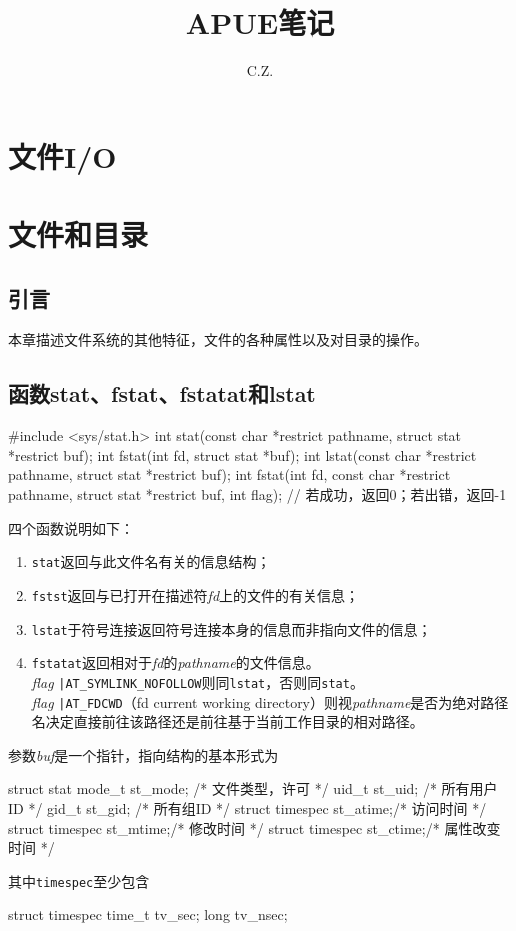 \documentclass{ctexart}
\title{APUE笔记}
\author{C.Z.}
\newcommand{\cod}[1]{\lstinline!#1!}
\newcommand{\funame}{\cod}
\newcommand{\const}{\cod}
\newcommand{\param}[1]{{\itshape #1}}
\newcommand{\struct}{\cod}
\begin{document}
  \maketitle
  \section{文件I/O}
  \section{文件和目录}
  \subsection{引言}
    本章描述文件系统的其他特征，文件的各种属性以及对目录的操作。
  \subsection{函数stat、fstat、fstatat和lstat}
  \begin{fun}[cc]
    #include <sys/stat.h>
    int stat(const char *restrict pathname, struct stat *restrict buf);
    int fstat(int fd, struct stat *buf);
    int lstat(const char *restrict pathname, struct stat *restrict buf);
    int fstat(int fd, const char *restrict pathname, struct stat *restrict buf, int flag);
    // 若成功，返回0；若出错，返回-1
  \end{fun}
  \par
  四个函数说明如下：
  \begin{enumerate}
    \item \funame{stat}返回与此文件名有关的信息结构；
    \item \funame{fstst}返回与已打开在描述符\param{fd}上的文件的有关信息；
    \item \funame{lstat}于符号连接返回符号连接本身的信息而非指向文件的信息；
    \item \funame{fstatat}返回相对于\param{fd}的\param{pathname}的文件信息。\\ \param{flag} \const{|AT_SYMLINK_NOFOLLOW}则同\funame{lstat}，否则同\funame{stat}。\\ \param{flag} \const{|AT_FDCWD}（fd current working directory）则视\param{pathname}是否为绝对路径名决定直接前往该路径还是前往基于当前工作目录的相对路径。
  \end{enumerate}
  \par
  参数\param{buf}是一个指针，指向结构的基本形式为
  \begin{fun}
    struct stat {
      mode_t          st_mode; /* 文件类型，许可 */
      uid_t           st_uid;  /* 所有用户ID */
      gid_t           st_gid;  /* 所有组ID */
      struct timespec st_atime;/* 访问时间 */
      struct timespec st_mtime;/* 修改时间 */
      struct timespec st_ctime;/* 属性改变时间 */
    }
  \end{fun}
  其中\struct{timespec}至少包含
  \begin{fun}
    struct timespec {
      time_t tv_sec;
      long tv_nsec;
    }
  \end{fun}
\end{document}
